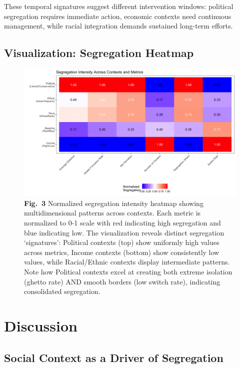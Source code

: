 \documentclass[pdflatex,sn-basic]{sn-jnl}%
\begin{document}
These temporal signatures suggest different intervention windows:
political segregation requires immediate action, economic contexts need
continuous management, while racial integration demands sustained
long-term efforts.

\subsection{Visualization: Segregation
Heatmap}\label{visualization-segregation-heatmap}


\begin{figure}[ht]
\centering
\includegraphics[width=\textwidth]{figures/heatmap-1.png}
\caption{\textbf{Fig.~3} Normalized segregation intensity heatmap showing
multidimensional patterns across contexts. Each metric is normalized to
0-1 scale with red indicating high segregation and blue indicating low.
The visualization reveals distinct segregation `signatures': Political
contexts (top) show uniformly high values across metrics, Income
contexts (bottom) show consistently low values, while Racial/Ethnic
contexts display intermediate patterns. Note how Political contexts
excel at creating both extreme isolation (ghetto rate) AND smooth
borders (low switch rate), indicating consolidated segregation.}
\label{fig:heatmap}
\end{figure}

\section{Discussion}\label{discussion}

\subsection{Social Context as a Driver of
Segregation}\label{social-context-as-a-driver-of-segregation}
\end{document}
